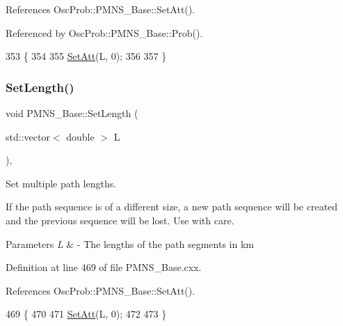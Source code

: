 References Osc\+Prob\+::\+P\+M\+N\+S\+\_\+\+Base\+::\+Set\+Att().



Referenced by Osc\+Prob\+::\+P\+M\+N\+S\+\_\+\+Base\+::\+Prob().


\begin{DoxyCode}
353                                  \{
354 
355   \hyperlink{classOscProb_1_1PMNS__Base_aba565962a440d14bee7a2a96d2eca2c5}{SetAtt}(L, 0);
356 
357 \}
\end{DoxyCode}
\mbox{\label{classOscProb_1_1PMNS__Base_aa34a40a3b5abda0f252982d9ead3b520}} 
\subsubsection{\texorpdfstring{Set\+Length()}{SetLength()}\hspace{0.1cm}{\footnotesize\ttfamily [2/2]}}
{\footnotesize\ttfamily void P\+M\+N\+S\+\_\+\+Base\+::\+Set\+Length (\begin{DoxyParamCaption}\item[{std\+::vector$<$ double $>$}]{L }\end{DoxyParamCaption})\hspace{0.3cm}{\ttfamily [virtual]}, {\ttfamily [inherited]}}

Set multiple path lengths.

If the path sequence is of a different size, a new path sequence will be created and the previous sequence will be lost. Use with care.


\begin{DoxyParams}{Parameters}
{\em L} & -\/ The lengths of the path segments in km \\
\hline
\end{DoxyParams}


Definition at line 469 of file P\+M\+N\+S\+\_\+\+Base.\+cxx.



References Osc\+Prob\+::\+P\+M\+N\+S\+\_\+\+Base\+::\+Set\+Att().


\begin{DoxyCode}
469                                             \{
470 
471   \hyperlink{classOscProb_1_1PMNS__Base_aba565962a440d14bee7a2a96d2eca2c5}{SetAtt}(L, 0);
472 
473 \}
\end{DoxyCode}
\mbox{\label{classOscProb_1_1PMNS__Fast_ad849b2231d99c5d66fb3ade8efb896e1}} 
